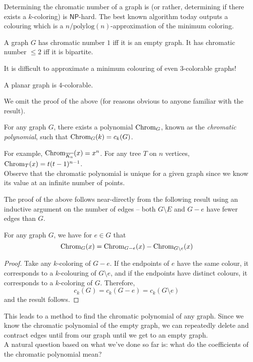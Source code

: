 	Determining the chromatic number of a graph is (or rather, determining if there exists a $k$-coloring) is $\mathsf{NP}$-hard. The best known algorithm today outputs a colouring which is a $n/\text{polylog}(n)$-approximation of the minimum coloring.

	\begin{prop}
		A graph $G$ has chromatic number $1$ iff it is an empty graph. It has chromatic number $\le 2$ iff it is bipartite.
	\end{prop}

	It is difficult to approximate a minimum colouring of even $3$-colorable graphs!

	\begin{ftheo}
		A planar graph is $4$-colorable.
	\end{ftheo}
	We omit the proof of the above (for reasons obvious to anyone familiar with the result).

	\begin{ftheo}
		For any graph $G$, there exists a polynomial $\operatorname{Chrom}_G$, known as the \emph{chromatic polynomial}, such that $\operatorname{Chrom}_G(k) = c_k(G)$.
	\end{ftheo}
	For example, $\operatorname{Chrom}_{\overline{K_n}}(x) = x^n$. For any tree $T$ on $n$ vertices, $\operatorname{Chrom}_T(x) = t(t-1)^{n-1}$.\\
	Observe that the chromatic polynomial is unique for a given graph since we know its value at an infinite number of points.
	
	The proof of the above follows near-directly from the following result using an inductive argument on the number of edges -- both $G\setminus E$ and $G-e$ have fewer edges than $G$.

	\begin{fprop}
		\label{prop: deletion contraction recurrence}
		For any graph $G$, we have for $e \in G$ that
		\[ \operatorname{Chrom}_G(x) = \operatorname{Chrom}_{G-e}(x) - \operatorname{Chrom}_{G\setminus e}(x) \]
	\end{fprop}
	\begin{proof}
		Take any $k$-coloring of $G-e$. If the endpoints of $e$ have the same colour, it corresponds to a $k$-colouring of $G\setminus e$, and if the endpoints have distinct colours, it corresponds to a $k$-coloring of $G$. Therefore,
		\[ c_k(G) = c_k(G-e) = c_k(G\setminus e) \]
		and the result follows.
	\end{proof}
	This leads to a method to find the chromatic polynomial of any graph. Since we know the chromatic polynomial of the empty graph, we can repeatedly delete and contract edges until from our graph until we get to an empty graph.\\
	A natural question based on what we've done so far is: what do the coefficients of the chromatic polynomial mean?

